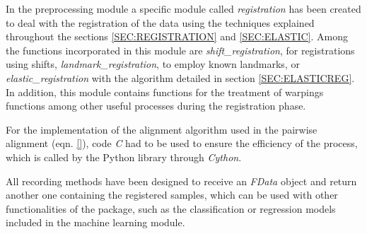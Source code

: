 
In the preprocessing module a specific module called \textit{registration} has
been created to deal with the registration of the data using the techniques
explained throughout the sections \ref{SEC:REGISTRATION} and \ref{SEC:ELASTIC}.
Among the functions incorporated in this module are \textit{shift\_registration},
for registrations using shifts, \textit{landmark\_registration},
to employ known landmarks, or \textit{elastic\_registration} with the algorithm
detailed in section \ref{SEC:ELASTICREG}.
In addition, this module contains functions for the treatment of
warpings functions among other useful processes during the registration phase.


For the implementation of the alignment algorithm used in the pairwise alignment
(eqn. \ref{}), code \textit{C} had to be used to ensure the efficiency of the process,
which is called by the Python library through \textit{Cython}.

All recording methods have been designed to receive an \textit{FData} object and
return another one containing the registered samples, which can be used with
other functionalities of the package, such as the classification or regression
models included in the machine learning module.

